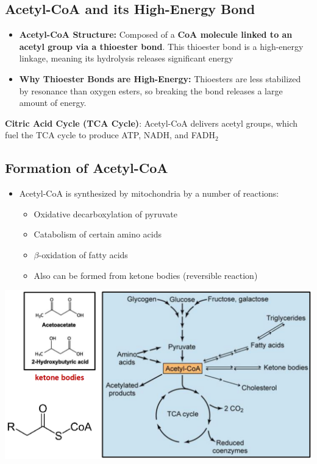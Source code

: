 \documentclass[10pt]{article}
\begin{document}
\subsection*{Acetyl-CoA and its High-Energy Bond}
\begin{itemize}
	\item \textbf{Acetyl-CoA Structure:}  Composed of a \textbf{CoA molecule linked to an acetyl group via a thioester bond}.  This thioester bond is a high-energy linkage, meaning its hydrolysis releases significant energy
	\item \textbf{Why Thioester Bonds are High-Energy:}  Thioesters are less stabilized by resonance than oxygen esters, so breaking the bond releases a large amount of energy.
\end{itemize}
\textbf{Citric Acid Cycle (TCA Cycle)}: Acetyl-CoA delivers acetyl groups, which fuel the TCA cycle to produce ATP, NADH, and FADH$_2$

\subsection*{Formation of Acetyl-CoA}
\begin{itemize}
	\item Acetyl-CoA is synthesized by mitochondria by a number of reactions:
	\begin{itemize}
        \item Oxidative decarboxylation of pyruvate
        \item Catabolism of certain amino acids
        \item $\beta$-oxidation of fatty acids
        \item Also can be formed from ketone bodies (reversible reaction)
    \end{itemize}
\end{itemize}
\begin{center} 
	\includegraphics*[scale=0.5]{L2_15.png}
\end{center}
\end{document}
